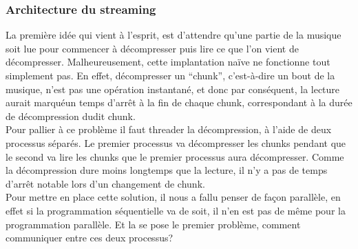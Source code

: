 \documentclass[a4paper,12pt]{article}
\begin{document}
		\subsubsection{Architecture du streaming}
La premi\`ere id\'ee qui vient à l'esprit, est d'attendre qu'une partie de la
musique soit lue pour commencer à d\'ecompresser puis lire ce que l'on vient de
d\'ecompresser. Malheureusement, cette implantation naïve ne fonctionne tout
simplement pas. En effet, d\'ecompresser un ``chunk'', c'est-à-dire un bout de la
musique, n'est pas une op\'eration instantan\'e, et donc par cons\'equent, la lecture
aurait marqu\'eun temps d'arr\^et à la fin de chaque chunk, correspondant à la
dur\'ee de d\'ecompression dudit chunk.\\
Pour pallier à ce probl\`eme il faut threader la d\'ecompression, à l'aide de deux
processus s\'epar\'es. Le premier processus va d\'ecompresser les chunks pendant que
le second va lire les chunks que le premier processus aura d\'ecompresser. Comme
la d\'ecompression dure moins longtemps que la lecture, il n'y a pas de temps
d'arr\^et notable lors d'un changement de chunk.\\
Pour mettre en place cette solution, il nous a fallu penser de façon parall\`ele,
en effet si la programmation s\'equentielle va de soit, il n'en est pas de m\^eme
pour la programmation parall\`ele. Et la se pose le premier probl\`eme, comment
communiquer entre ces deux processus?\\
\end{document}
